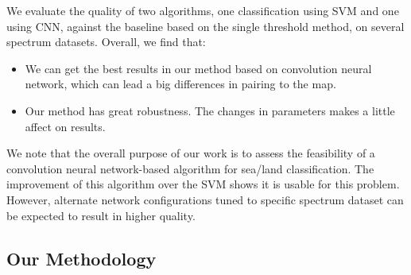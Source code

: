 We evaluate the quality of two algorithms, one classification using SVM and one using CNN, against the baseline based on the single threshold method, on several spectrum datasets. Overall, we find that:

\begin{itemize}
	\item We can get the best results in our method based on convolution neural network, which can lead a big differences in pairing to the map.
	\item Our method has great robustness. The changes in parameters makes a little affect on results.
\end{itemize}
We note that the overall purpose of our work is to assess the feasibility of a convolution neural network-based algorithm for sea/land classification. The improvement of this algorithm over the SVM shows it is usable for this problem. However, alternate network configurations tuned to specific spectrum dataset can be expected to result in higher quality.



\subsection{Our Methodology}


